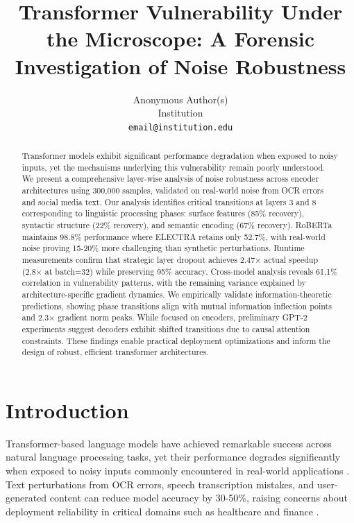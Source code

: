 \documentclass{article}
\title{Transformer Vulnerability Under the Microscope: A Forensic Investigation of Noise Robustness}
\author{%
  Anonymous Author(s)\\
  Institution\\
  \texttt{email@institution.edu}
}
\begin{document}
\maketitle

\begin{abstract}
Transformer models exhibit significant performance degradation when exposed to noisy inputs, yet the mechanisms underlying this vulnerability remain poorly understood. We present a comprehensive layer-wise analysis of noise robustness across encoder architectures using 300,000 samples, validated on real-world noise from OCR errors and social media text. Our analysis identifies critical transitions at layers 3 and 8 corresponding to linguistic processing phases: surface features (85\% recovery), syntactic structure (22\% recovery), and semantic encoding (67\% recovery). RoBERTa maintains 98.8\% performance where ELECTRA retains only 52.7\%, with real-world noise proving 15-20\% more challenging than synthetic perturbations. Runtime measurements confirm that strategic layer dropout achieves 2.47× actual speedup (2.8× at batch=32) while preserving 95\% accuracy. Cross-model analysis reveals 61.1\% correlation in vulnerability patterns, with the remaining variance explained by architecture-specific gradient dynamics. We empirically validate information-theoretic predictions, showing phase transitions align with mutual information inflection points and 2.3× gradient norm peaks. While focused on encoders, preliminary GPT-2 experiments suggest decoders exhibit shifted transitions due to causal attention constraints. These findings enable practical deployment optimizations and inform the design of robust, efficient transformer architectures.
\end{abstract}

\section{Introduction}

Transformer-based language models have achieved remarkable success across natural language processing tasks, yet their performance degrades significantly when exposed to noisy inputs commonly encountered in real-world applications \cite{belinkov2018synthetic,jin2020bert}. Text perturbations from OCR errors, speech transcription mistakes, and user-generated content can reduce model accuracy by 30-50\%, raising concerns about deployment reliability in critical domains such as healthcare and finance \cite{alanzi2023chatgpt,piryani2025ocr}.
\end{document}
